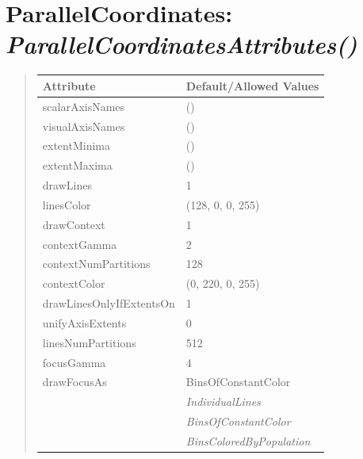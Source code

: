 \documentclass[letterpaper,10pt,english]{sphinxmanual}
\begin{document}
\begin{DUlineblock}{0em}
\item[] 
\end{DUlineblock}


\section{\textbf{ParallelCoordinates}: \emph{ParallelCoordinatesAttributes()}}
\label{attributes:parallelcoordinates-parallelcoordinatesattributes}
\begin{DUlineblock}{0em}
\item[] 
\end{DUlineblock}
\begin{quote}

\begin{tabulary}{\linewidth}{|L|L|}
\hline

\textbf{Attribute}
 & 
\textbf{Default/Allowed Values}
\\
\hline
scalarAxisNames
 & 
()
\\
\hline
visualAxisNames
 & 
()
\\
\hline
extentMinima
 & 
()
\\
\hline
extentMaxima
 & 
()
\\
\hline
drawLines
 & 
1
\\
\hline
linesColor
 & 
(128, 0, 0, 255)
\\
\hline
drawContext
 & 
1
\\
\hline
contextGamma
 & 
2
\\
\hline
contextNumPartitions
 & 
128
\\
\hline
contextColor
 & 
(0, 220, 0, 255)
\\
\hline
drawLinesOnlyIfExtentsOn
 & 
1
\\
\hline
unifyAxisExtents
 & 
0
\\
\hline
linesNumPartitions
 & 
512
\\
\hline
focusGamma
 & 
4
\\
\hline
drawFocusAs
 & 
BinsOfConstantColor
\\
\hline & 
\emph{IndividualLines}
\\
\hline & 
\emph{BinsOfConstantColor}
\\
\hline & 
\emph{BinsColoredByPopulation}
\\
\hline\end{tabulary}

\end{quote}

\begin{DUlineblock}{0em}
\item[] 
\end{DUlineblock}
\end{document}
